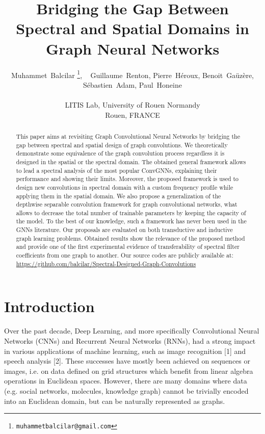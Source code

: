 \documentclass{article}
\title{Bridging the Gap Between Spectral and Spatial Domains in Graph  
Neural Networks }
\author{
  Muhammet~Balcilar
   \thanks{\texttt{muhammetbalcilar@gmail.com}}, ~ 
   Guillaume~Renton,
   Pierre~H\'eroux,
   Benoit~Ga\"uz\`ere, 
   S\'ebastien~Adam,    
   Paul~Honeine  
   \\ \\
 LITIS Lab, University of Rouen Normandy \\
 Rouen, FRANCE \\
}
\begin{document}
\maketitle

\begin{abstract}
This paper aims at revisiting Graph Convolutional Neural Networks by bridging the gap between spectral and spatial design of graph convolutions. We theoretically demonstrate some equivalence of the graph convolution process regardless it is designed in the spatial or the spectral domain. The obtained general framework allows to lead a spectral analysis of the most popular ConvGNNs, explaining their performance and showing their limits. Moreover, the proposed framework is used to design new convolutions in spectral domain with a custom frequency profile while applying them in the spatial domain. We also propose a generalization of the depthwise separable convolution framework for graph convolutional networks, what allows to decrease the total number of trainable parameters by keeping the capacity of the model. To the best of our knowledge, such a framework has never been used in the GNNs literature. Our proposals are evaluated on both transductive and inductive graph learning problems. Obtained results show the relevance of the proposed method and provide one of the first experimental evidence of transferability of spectral filter coefficients from one graph to another. Our source codes are publicly
available at: \\ {\color{blue}\url{https://github.com/balcilar/Spectral-Designed-Graph-Convolutions}}
\end{abstract}




\section{Introduction  }
Over the past decade, Deep Learning, and more specifically Convolutional Neural Networks (CNNs) and Recurrent Neural Networks (RNNs), had a strong impact in various applications of machine learning, such as image recognition [1] and speech analysis [2]. These successes have mostly been achieved on sequences or images, i.e. on data defined on grid structures which benefit from linear algebra operations in Euclidean spaces. However, there are many domains where data (e.g. social networks, molecules, knowledge graph) cannot be trivially encoded into an Euclidean domain, but can be naturally represented as graphs. 
\end{document}
